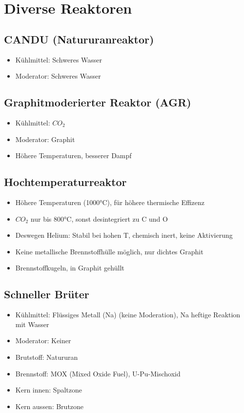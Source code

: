 \documentclass[12pt]{article}
\begin{document}
\section{Diverse Reaktoren}

\subsection{CANDU (Natururanreaktor)}
\begin{itemize}
  \item Kühlmittel: Schweres Wasser
  \item Moderator: Schweres Wasser
\end{itemize}

\subsection{Graphitmoderierter Reaktor (AGR)}
\begin{itemize}
  \item Kühlmittel: \(CO_2\)
  \item Moderator: Graphit
  \item Höhere Temperaturen, besserer Dampf
\end{itemize}

\subsection{Hochtemperaturreaktor}
\begin{itemize}
  \item Höhere Temperaturen (1000°C), für höhere thermische Effizenz
  \item \(CO_2\) nur bis 800°C, sonst desintegriert zu C und O
  \item Deswegen Helium: Stabil bei hohen T, chemisch inert, keine Aktivierung
  \item Keine metallische Brennstoffhülle möglich, nur dichtes Graphit
  \item Brennstoffkugeln, in Graphit gehüllt
\end{itemize}

\subsection{Schneller Brüter}
\begin{itemize}
  \item Kühlmittel: Flüssiges Metall (Na) (keine Moderation), Na heftige Reaktion mit Wasser
  \item Moderator: Keiner
  \item Brutstoff: Natururan
  \item Brennstoff: MOX (Mixed Oxide Fuel), U-Pu-Mischoxid
  \item Kern innen: Spaltzone
  \item Kern aussen: Brutzone
\end{itemize}
\end{document}
